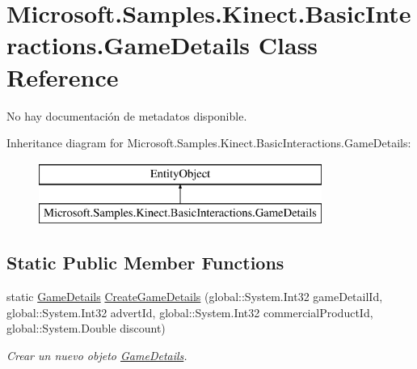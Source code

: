 \hypertarget{class_microsoft_1_1_samples_1_1_kinect_1_1_basic_interactions_1_1_game_details}{\section{Microsoft.\-Samples.\-Kinect.\-Basic\-Interactions.\-Game\-Details Class Reference}
\label{class_microsoft_1_1_samples_1_1_kinect_1_1_basic_interactions_1_1_game_details}
}


No hay documentación de metadatos disponible.  


Inheritance diagram for Microsoft.\-Samples.\-Kinect.\-Basic\-Interactions.\-Game\-Details\-:\begin{figure}[H]
\begin{center}
\leavevmode
\includegraphics[height=2.000000cm]{class_microsoft_1_1_samples_1_1_kinect_1_1_basic_interactions_1_1_game_details}
\end{center}
\end{figure}
\subsection*{Static Public Member Functions}
\begin{DoxyCompactItemize}
\item 
static \hyperlink{class_microsoft_1_1_samples_1_1_kinect_1_1_basic_interactions_1_1_game_details}{Game\-Details} \hyperlink{class_microsoft_1_1_samples_1_1_kinect_1_1_basic_interactions_1_1_game_details_a543a4e1b60ad0326edd768884fb4f213}{Create\-Game\-Details} (global\-::\-System.\-Int32 game\-Detail\-Id, global\-::\-System.\-Int32 advert\-Id, global\-::\-System.\-Int32 commercial\-Product\-Id, global\-::\-System.\-Double discount)
\begin{DoxyCompactList}\small\item\em Crear un nuevo objeto \hyperlink{class_microsoft_1_1_samples_1_1_kinect_1_1_basic_interactions_1_1_game_details}{Game\-Details}. \end{DoxyCompactList}\end{DoxyCompactItemize}
